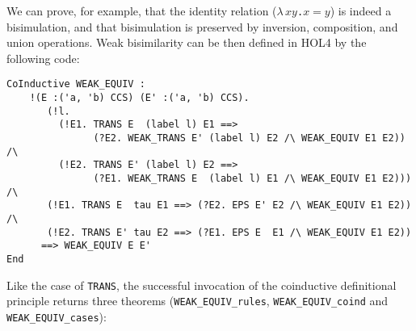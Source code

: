 \documentclass[GCNS]{yincog}
\renewcommand{\HOLinline}[1]{\mbox{\textup{\texttt{#1}}}}
\renewcommand{\HOLConst}[1]{\texttt{#1}}
\renewcommand{\HOLBoundVar}[1]{\ensuremath{\mathit{#1}}}
\renewcommand{\HOLSymConst}[1]{#1}
\renewcommand{\HOLTokenLambda}{\ensuremath{\lambda \,}}
\theoremstyle{remark}
\theoremstyle{theorem}
\theoremstyle{remark}
\begin{document}
We can prove, for example, that the identity relation (\HOLinline{\HOLTokenLambda{}\HOLBoundVar{x}\;\!\HOLBoundVar{y}.\;\!\HOLBoundVar{x}\;\!\HOLSymConst{\ensuremath{=}}\;\!\HOLBoundVar{y}})
is indeed a bisimulation, and that bisimulation is preserved by inversion,
composition, and union operations. Weak bisimilarity can be then defined
in HOL4 by the following code:
%
\begin{lstlisting}
CoInductive WEAK_EQUIV :
    !(E :('a, 'b) CCS) (E' :('a, 'b) CCS).
       (!l.
         (!E1. TRANS E  (label l) E1 ==>
               (?E2. WEAK_TRANS E' (label l) E2 /\ WEAK_EQUIV E1 E2)) /\
         (!E2. TRANS E' (label l) E2 ==>
               (?E1. WEAK_TRANS E  (label l) E1 /\ WEAK_EQUIV E1 E2))) /\
       (!E1. TRANS E  tau E1 ==> (?E2. EPS E' E2 /\ WEAK_EQUIV E1 E2)) /\
       (!E2. TRANS E' tau E2 ==> (?E1. EPS E  E1 /\ WEAK_EQUIV E1 E2))
      ==> WEAK_EQUIV E E'
End
\end{lstlisting} Like the case of \HOLinline{\HOLConst{TRANS}}, the successful
invocation of the coinductive definitional principle returns three theorems
(\texttt{WEAK\_EQUIV\_rules}, \texttt{WEAK\_EQUIV\_coind} and
\texttt{WEAK\_EQUIV\_cases}):
%
\end{document}
